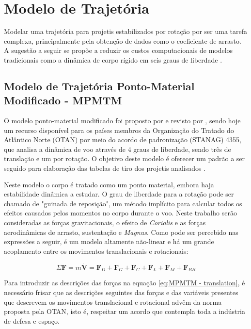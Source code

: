 \chapter{Modelo de Trajetória}\label{cap:trajetoria}
\graphicspath{{chapter-05/img-cap05/}}

Modelar uma trajetória para projetis estabilizados por rotação por ser uma tarefa complexa, principalmente pela obtenção de dados como o coeficiente de arrasto. A sugestão a seguir se propõe a reduzir os custos computacionais de modelos tradicionais como a dinâmica de corpo rígido em seis graus de liberdade \cite{McCoy2012}.

\section{Modelo de Trajetória Ponto-Material Modificado - MPMTM}
\label{subsec:MPMTM}

O modelo ponto-material modificado foi proposto por \citeauthor{Lieske1966} e revisto por \citeauthor{Baranowski2013-3}, sendo hoje um recurso disponível para os países membros da Organização do Tratado do Atlântico Norte (OTAN) \cite{stanag4355} por meio do acordo de padronização (STANAG) 4355, que analisa a dinâmica de voo através de 4 graus de liberdade, sendo três de translação e um por rotação. O objetivo deste modelo é oferecer um padrão a ser seguido para elaboração das tabelas de tiro dos projetis analisados \cite{McCoy2012,Carlucci2018}.

Neste modelo o corpo é tratado como um ponto material, embora haja estabilidade dinâmica a estudar. O grau de liberdade para a rotação pode ser chamado de "guinada de reposição", um método implícito para calcular todos os efeitos causados pelos momentos no corpo durante o voo. Neste trabalho serão consideradas as forças gravitacionais, o efeito de \textit{Coriolis} e as forças aerodinâmicas de arrasto, sustentação e \textit{Magnus}. Como pode ser percebido nas expressões a seguir, é um modelo altamente não-linear e há um grande acoplamento entre os movimentos translacionais e rotacionais:

\begin{equation}
    \label{eq:MPMTM - translation}
    \Sigma\boldsymbol{F} = m \dot{\boldsymbol{V}} = \boldsymbol{F}_{D} + \boldsymbol{F}_{G} + \boldsymbol{F}_{C} + \boldsymbol{F}_{L} + \boldsymbol{F}_{M} + \boldsymbol{F}_{BB}
\end{equation}

Para introduzir as descrições das forças na equação \ref{eq:MPMTM - translation}, é necessário frisar que as descrições seguintes das forças e das variáveis presentes que descrevem os movimentos translacional e rotacional advêm da norma proposta pela OTAN, isto é, respeitar um acordo que contempla toda a indústria de defesa e espaço.

